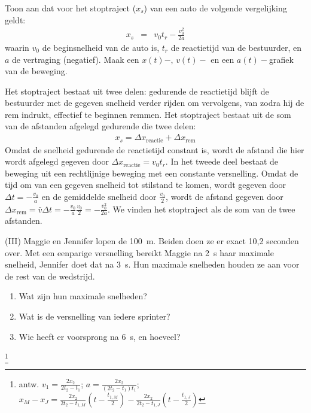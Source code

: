 \documentclass{ximera}
\begin{document}
\begin{exercise} Toon aan dat voor het stoptraject ($x_s$) van een auto de volgende vergelijking geldt:
\begin{eqnarray*}
x_s&=&v_0t_r-\frac{v_0^2}{2a}
\end{eqnarray*}
waarin $v_0$ de beginsnelheid van de auto is, $t_r$ de reactietijd van de bestuurder, en $a$ de vertraging (negatief).
\newline
\newline
Maak een $x(t)-,\,v(t)-$ en een $a(t)-$grafiek van de beweging.
\begin{oplossing}
\newline
\newline
Het stoptraject bestaat uit twee delen: gedurende de reactietijd blijft de bestuurder met de gegeven snelheid verder rijden om vervolgens, van zodra hij de rem indrukt, effectief te beginnen remmen. Het stoptraject bestaat uit de som van de afstanden afgelegd gedurende die twee delen:
\begin{eqnarray*}
x_s=\Delta x_{\mathrm{reactie}}+\Delta x_{\mathrm{rem}}
\end{eqnarray*}
Omdat de snelheid gedurende de reactietijd constant is, wordt de afstand die hier wordt afgelegd gegeven door $\Delta x_{\mathrm{reactie}}=v_0t_r$. In het tweede deel bestaat de beweging uit een rechtlijnige beweging met een constante versnelling. Omdat de tijd om van een gegeven snelheid tot stilstand te komen, wordt gegeven door $\Delta t=-\frac{v_0}{a}$ en de gemiddelde snelheid door $\frac{v_0}{2}$, wordt de afstand gegeven door $\Delta x_{\mathrm{rem}}=\bar{v}\Delta t=-\frac{v_0}{a}\frac{v_0}{2}=-\frac{v_0^2}{2a}$. We vinden het stoptraject als de som van de twee afstanden.
\end{oplossing}



\end{exercise}

\begin{exercise} (III) Maggie en Jennifer lopen de \SI{100}{m}. Beiden doen ze er exact 10,2 se\-conden over. Met een eenparige versnelling bereikt Maggie na \SI{2}{s} haar maximale snelheid, Jennifer doet dat na \SI{3}{s}. Hun maximale snelheden houden ze aan voor de rest van de wedstrijd.
\begin{enumerate}
\item Wat zijn hun maximale snelheden?
\item Wat is de versnelling van iedere sprinter?
\item Wie heeft er voorsprong na \SI{6}{s}, en hoeveel?
\end{enumerate}
\begin{oplossing}
\footnote{antw. $v_1=\frac{2x_2}{2t_2-t_1}$;
$a=\frac{2x_2}{(2t_2-t_1)t_1}$;
$x_M-x_J=\frac{2x_2}{2t_2-t_{1,M}}(t-\frac{t_{1,M}}{2})-\frac{2x_2}{2t_2-t_{1,J}}(t-\frac{t_{1,J}}{2})$}
\end{oplossing}

\end{exercise}
\end{document}

